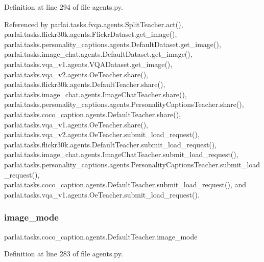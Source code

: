 Definition at line 294 of file agents.\+py.



Referenced by parlai.\+tasks.\+fvqa.\+agents.\+Split\+Teacher.\+act(), parlai.\+tasks.\+flickr30k.\+agents.\+Flickr\+Dataset.\+get\+\_\+image(), parlai.\+tasks.\+personality\+\_\+captions.\+agents.\+Default\+Dataset.\+get\+\_\+image(), parlai.\+tasks.\+image\+\_\+chat.\+agents.\+Default\+Dataset.\+get\+\_\+image(), parlai.\+tasks.\+vqa\+\_\+v1.\+agents.\+V\+Q\+A\+Dataset.\+get\+\_\+image(), parlai.\+tasks.\+vqa\+\_\+v2.\+agents.\+Oe\+Teacher.\+share(), parlai.\+tasks.\+flickr30k.\+agents.\+Default\+Teacher.\+share(), parlai.\+tasks.\+image\+\_\+chat.\+agents.\+Image\+Chat\+Teacher.\+share(), parlai.\+tasks.\+personality\+\_\+captions.\+agents.\+Personality\+Captions\+Teacher.\+share(), parlai.\+tasks.\+coco\+\_\+caption.\+agents.\+Default\+Teacher.\+share(), parlai.\+tasks.\+vqa\+\_\+v1.\+agents.\+Oe\+Teacher.\+share(), parlai.\+tasks.\+vqa\+\_\+v2.\+agents.\+Oe\+Teacher.\+submit\+\_\+load\+\_\+request(), parlai.\+tasks.\+flickr30k.\+agents.\+Default\+Teacher.\+submit\+\_\+load\+\_\+request(), parlai.\+tasks.\+image\+\_\+chat.\+agents.\+Image\+Chat\+Teacher.\+submit\+\_\+load\+\_\+request(), parlai.\+tasks.\+personality\+\_\+captions.\+agents.\+Personality\+Captions\+Teacher.\+submit\+\_\+load\+\_\+request(), parlai.\+tasks.\+coco\+\_\+caption.\+agents.\+Default\+Teacher.\+submit\+\_\+load\+\_\+request(), and parlai.\+tasks.\+vqa\+\_\+v1.\+agents.\+Oe\+Teacher.\+submit\+\_\+load\+\_\+request().

\mbox{\label{classparlai_1_1tasks_1_1coco__caption_1_1agents_1_1DefaultTeacher_a9b0ff4c5a830f5b5028ae5f9bb53b62c}} 
\subsubsection{\texorpdfstring{image\+\_\+mode}{image\_mode}}
{\footnotesize\ttfamily parlai.\+tasks.\+coco\+\_\+caption.\+agents.\+Default\+Teacher.\+image\+\_\+mode}



Definition at line 283 of file agents.\+py.



